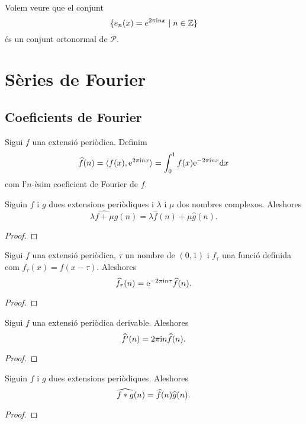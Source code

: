 \documentclass[../Apunts.tex]{subfiles}
\begin{document}
	\begin{example}
		\label{ex:base ortonormal de les extensions periòdiques}
		Volem veure que el conjunt
		\[\{e_{n}(x)=e^{2\pi\mathrm{i} nx}\mid n\in\mathbb{Z}\}\]
		és un conjunt ortonormal de \(\mathcal{P}\).
		\begin{solution}
		\end{solution}
	\end{example}
\section{Sèries de Fourier}
	\subsection{Coeficients de Fourier}
	\begin{definition}
		\label{def:coeficients de Fourier}
		Sigui \(f\) una extensió periòdica. Definim
		\[\widehat{f}(n)=\langle f(x),\mathrm{e}^{2\pi\mathrm{i} nx}\rangle=\int_{0}^{1}f(x)\mathrm{e}^{-2\pi\mathrm{i} nx}\mathrm{d} x\]
		com l'\(n\)-èsim coeficient de Fourier de \(f\).
	\end{definition}
	\begin{proposition}
		Siguin \(f\) i \(g\) dues extensions periòdiques i \(\lambda\) i \(\mu\) dos nombres complexos. Aleshores
		\[\widehat{\lambda f+\mu g}(n)=\lambda\widehat{f}(n)+\mu\widehat{g}(n).\]
		\begin{proof}
		\end{proof}
	\end{proposition}
	\begin{proposition}
		Sigui \(f\) una extensió periòdica, \(\tau\) un nombre de \((0,1)\) i \(f_{\tau}\) una funció definida com \(f_{\tau}(x)=f(x-\tau)\). Aleshores
		\[\widehat{f_{\tau}}(n)=\mathrm{e}^{-2\pi\mathrm{i} n\tau}\widehat{f}(n).\]
		\begin{proof}
		\end{proof}
	\end{proposition}
	\begin{proposition}
		Sigui \(f\) una extensió periòdica derivable. Aleshores
		\[\widehat{f'}(n)=2\pi\mathrm{i} n\widehat{f}(n).\]
		\begin{proof}
		\end{proof}
	\end{proposition}
	\begin{proposition}
		Siguin \(f\) i \(g\) dues extensions periòdiques. Aleshores
		\[\widehat{f\ast g}(n)=\widehat{f}(n)\widehat{g}(n).\]
		\begin{proof}
		\end{proof}
	\end{proposition}
\end{document}
